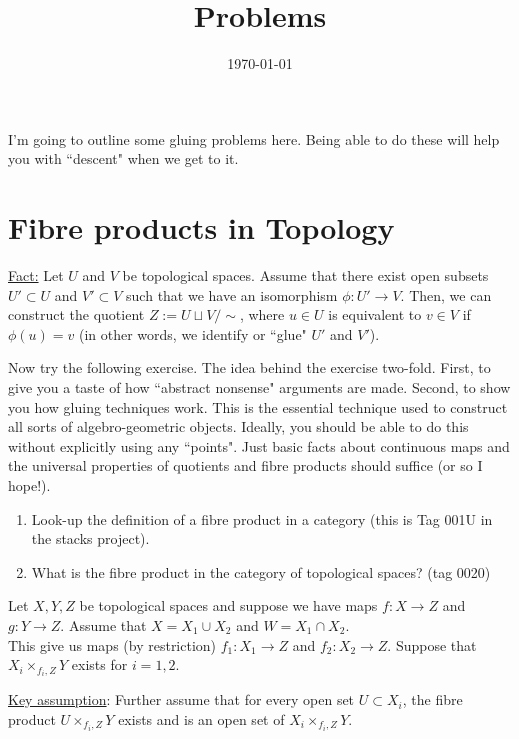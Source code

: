 \documentclass[10pt]{amsart}
\theoremstyle{definition}
\begin{document}
\title{Problems}

\author{}
\date{\today}

\maketitle
I'm going to outline some gluing problems here. Being able to do these will help you with ``descent" when we get to it.

\section{Fibre products in Topology}


\noindent\underline{Fact:} Let $U$ and $V$ be topological spaces. Assume that there exist open subsets $U'\subset U$ and $V'\subset V$ such that we have an isomorphism $\phi: U'\rightarrow V$. Then, we can construct the quotient $Z:= U\sqcup V/\sim$, where $u\in U$ is equivalent to $v\in V$ if $\phi(u)=v$ (in other words, we identify or ``glue" $U'$ and $V'$).

Now try the following exercise. The idea behind the exercise two-fold. First, to give you a taste of how ``abstract nonsense" arguments are made. Second, to show you how gluing techniques work. This is the essential technique used to construct all sorts of algebro-geometric objects. Ideally, you should be able to do this without explicitly using any ``points". Just basic facts about continuous maps and the universal properties of quotients and fibre products should suffice (or so I hope!).

\begin{enumerate}\addtocounter{enumi}{-1}
	\item Look-up the definition of a fibre product in a category (this is Tag 001U in the stacks project).
	\item What is the fibre product in the category of topological spaces? (tag 0020)
\end{enumerate}

Let $X, Y, Z$  be topological spaces and suppose we have maps $f:X\rightarrow Z$ and $g:Y\rightarrow Z$.
Assume that $X=X_1 \cup X_2$ and $W=X_1\cap X_2$.\\
This give us maps (by restriction) $f_1: X_1\rightarrow Z$ and $f_2:X_2\rightarrow Z$. Suppose that $X_i\times_{f_i,Z} Y$ exists for $i=1,2$.

\noindent\underline{Key assumption}: Further assume that for every open set $U\subset X_i$, the fibre product $U\times_{f_i,Z}Y$ exists and is an open set of $X_i\times_{f_i,Z}Y$.
\end{document}
